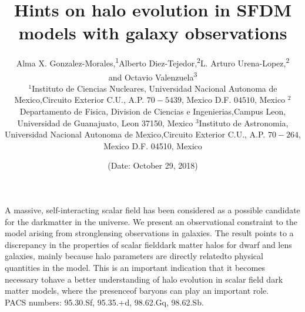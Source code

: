 \documentclass{article}\newcommand\Star[1]{#1\textsuperscript{*}}
\title{Hints on halo evolution in SFDM models with galaxy observations}
\author{
	Alma X. Gonzalez-Morales,\textsuperscript{1}Alberto Diez-Tejedor,\textsuperscript{2}L. Arturo Urena-Lopez,\textsuperscript{2}\\and Octavio Valenzuela\textsuperscript{3} \\
	\(^{1}\)Instituto  de  Ciencias  Nucleares,  Universidad  Nacional  Autonoma  de  Mexico,Circuito  Exterior  C.U.,  A.P.  \(70-5439\),  Mexico  D.F.  \(04510\),  Mexico \(^{2}\)Departamento  de  Fisica,  Division  de  Ciencias  e  Ingenierias,Campus  Leon,  Universidad  de  Guanajuato,  Leon  37150,  Mexico \(^{3}\)Instituto  de  Astronomia,  Universidad  Nacional  Autonoma  de  Mexico,Circuito  Exterior  C.U.,  A.P.  \(70-264\),  Mexico  D.F.  04510,  Mexico
}
\date{(Date: October 29, 2018)}
\begin{document}
	\pagestyle{empty}
	\maketitle
	\thispagestyle{empty}
	A massive, self-interacting scalar field has been considered as a possible candidate for the darkmatter in the universe.  We present an observational constraint to the model arising from stronglensing observations in galaxies.  The result points to a discrepancy in the properties of scalar fielddark matter halos for dwarf and lens galaxies, mainly because halo parameters are directly relatedto physical quantities in the model.  This is an important indication that it becomes necessary tohave a better understanding of halo evolution in scalar field dark matter models, where the presenceof baryons can play an important role.\\PACS numbers:  95.30.Sf, 95.35.+d, 98.62.Gq, 98.62.Sb.
\end{document}
